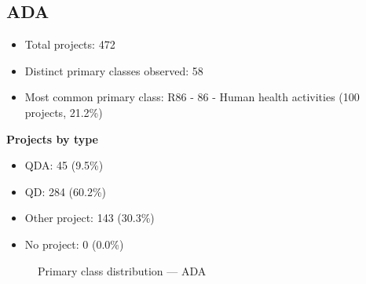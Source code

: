 \subsection{ADA}

\begin{itemize}
    \item Total projects: 472
    \item Distinct primary classes observed: 58
    \item Most common primary class: R86 - 86 - Human health activities (100 projects, 21.2\%)
\end{itemize}
\textbf{Projects by type}
\begin{itemize}
    \item QDA: 45 (9.5\%)
    \item QD: 284 (60.2\%)
    \item Other project: 143 (30.3\%)
    \item No project: 0 (0.0\%)
\end{itemize}

\begin{figure}[h]
    \centering
    
    \caption{Primary class distribution --- ADA}
\end{figure}

